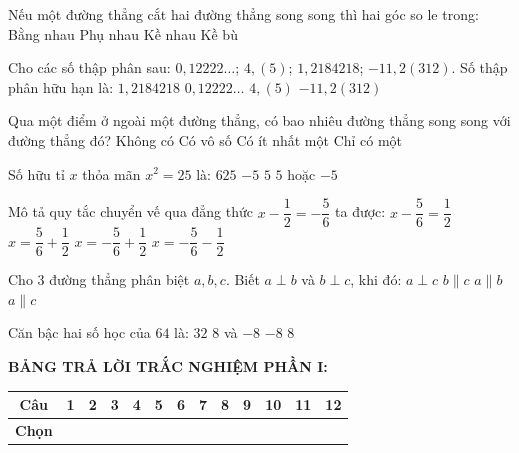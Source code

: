 \documentclass[12pt,a4paper]{article}
\begin{document}
\begin{ex}
Nếu một đường thẳng cắt hai đường thẳng song song thì hai góc so le trong:
\choice
{\True Bằng nhau}
{Phụ nhau}
{Kề nhau}
{Kề bù}
\end{ex}

\begin{ex}
Cho các số thập phân sau: $0{,}12222\dots$; $4{,}(5)$; $1{,}2184218$; $-11{,}2(312)$. Số thập phân hữu hạn là:
\choice
{\True $1{,}2184218$}
{$0{,}12222\dots$}
{$4{,}(5)$}
{$-11{,}2(312)$}
\end{ex}

\begin{ex}
Qua một điểm ở ngoài một đường thẳng, có bao nhiêu đường thẳng song song với đường thẳng đó?
\choice
{Không có}
{Có vô số}
{Có ít nhất một}
{\True Chỉ có một}
\end{ex}

\begin{ex}
Số hữu tỉ $x$ thỏa mãn $x^2 = 25$ là:
\choice
{$625$}
{$-5$}
{$5$}
{\True $5$ hoặc $-5$}
\end{ex}

\begin{ex}
Mô tả quy tắc chuyển vế qua đẳng thức $x - \dfrac{1}{2} = -\dfrac{5}{6}$ ta được:
\choice
{$x - \dfrac{5}{6} = \dfrac{1}{2}$}
{$x = \dfrac{5}{6} + \dfrac{1}{2}$}
{\True $x = -\dfrac{5}{6} + \dfrac{1}{2}$}
{$x = -\dfrac{5}{6} - \dfrac{1}{2}$}
\end{ex}

\begin{ex}
Cho 3 đường thẳng phân biệt $a, b, c$. Biết $a \perp b$ và $b \perp c$, khi đó:
\choice
{$a \perp c$}
{$b \parallel c$}
{$a \parallel b$}
{\True $a \parallel c$}
\end{ex}

\begin{ex}
Căn bậc hai số học của $64$ là:
\choice
{$32$}
{$8$ và $-8$}
{$-8$}
{\True $8$}
\end{ex}


\vspace{1mm}
\noindent\textbf{BẢNG TRẢ LỜI TRẮC NGHIỆM PHẦN I:}
\begin{center}
\begin{tabular}{|c|c|c|c|c|c|c|c|c|c|c|c|c|}
\hline
\textbf{Câu} & \textbf{1} & \textbf{2} & \textbf{3} & \textbf{4} & \textbf{5} & \textbf{6} & \textbf{7} & \textbf{8} & \textbf{9} & \textbf{10} & \textbf{11} & \textbf{12} \\
\hline
\textbf{Chọn} & \rule{0pt}{0.65cm} & & & & & & & & & & & \\
\hline
\end{tabular}
\end{center}
\vspace{2mm}
\end{document}
